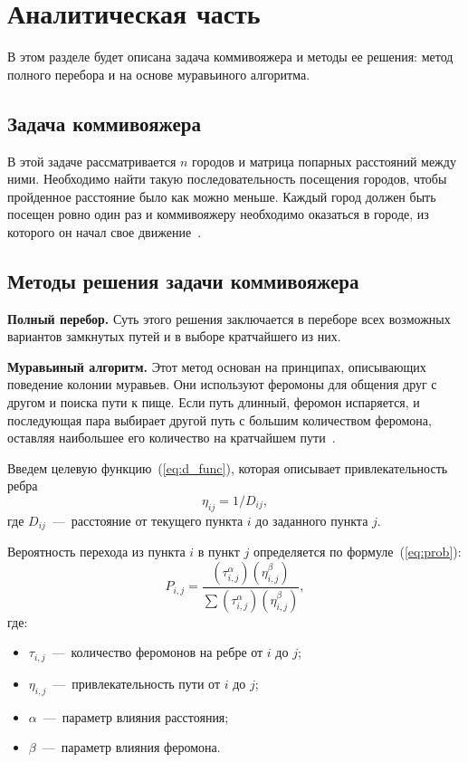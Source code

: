 \chapter{Аналитическая часть}
В этом разделе будет описана задача коммивояжера и методы ее решения: метод полного перебора и на основе муравьиного алгоритма.

\section{Задача коммивояжера}
В этой задаче рассматривается $n$ городов и матрица попарных расстояний между ними. 
Необходимо найти такую последовательность посещения городов, чтобы пройденное расстояние было как можно меньше.
Каждый город должен быть посещен ровно один раз и коммивояжеру необходимо оказаться в городе, из которого он начал свое движение~\cite{salesman}. 

\section{Методы решения задачи коммивояжера}
\textbf{Полный перебор.}
Суть этого решения заключается в переборе всех возможных вариантов замкнутых путей и в выборе кратчайшего из них. 

\textbf{Муравьиный алгоритм.}
Этот метод основан на принципах, описывающих поведение колонии муравьев.
Они используют феромоны для общения друг с другом и поиска пути к пище.
Если путь длинный, феромон испаряется, и последующая пара выбирает другой путь с большим количеством феромона, оставляя наибольшее его количество на кратчайшем пути~\cite{shtovba}.

Введем целевую функцию~(\ref{eq:d_func}), которая описывает привлекательность ребра
\begin{equation}
	\label{eq:d_func}
	\eta_{ij} = 1 / D_{ij},
\end{equation}
где $D_{ij}$~---~расстояние от текущего пункта $i$ до заданного пункта $j$.

Вероятность перехода из пункта $i$ в пункт $j$ определяется по формуле~(\ref{eq:prob}):
\begin{equation}
	\label{eq:prob}
	P_{i,j}={\frac {(\tau_{i,j}^{\alpha})(\eta_{i,j}^{\beta })}{\sum (\tau_{i,j}^{\alpha})(\eta_{i,j}^{\beta})}},
\end{equation}
где:
\begin{itemize}
	\item $\tau_{i,j}$~---~количество феромонов на ребре от $i$ до $j$;
	\item $\eta_{i,j}$~---~привлекательность пути от $i$ до $j$;
	\item $\alpha$~---~параметр влияния расстояния;
	\item $\beta$~---~параметр влияния феромона.
\end{itemize}

